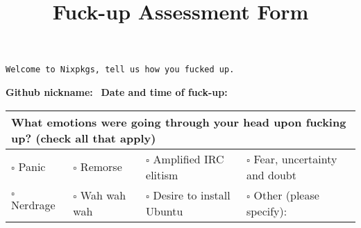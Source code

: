\documentclass{article}
\title{\hspace{-0.39\columnwidth}Fuck-up Assessment Form}
\author{}
\date{\vspace{-3.5em}}
\begin{document}
\maketitle

\begin{center}
\texttt{Welcome to Nixpkgs, tell us how you fucked up.}
\end{center}

\vspace{1em}
\textbf{Github nickname:} \dotfill
\ \textbf{Date and time of fuck-up:} \dotfill
\vspace{0.5em}

\def\arraystretch{1.5}  %
\begin{tabularx}{\textwidth}{|lllX|}
\hline
\multicolumn{4}{|l|}{\textbf{What emotions were going through your head upon fucking up?} (check all that apply)} \\ \hline
\(\square\) Panic &
\(\square\) Remorse &
\(\square\) Amplified IRC elitism &
\(\square\) Fear, uncertainty and doubt \\

\(\square\) Nerdrage &
\(\square\) Wah wah wah &
\(\square\) Desire to install Ubuntu &
\(\square\) Other (please specify): \dotfill \\ \hline
\end{tabularx}

\vspace{0.5em}

\newlength{\listenedwidth}
\newlength{\didntlistenwidth}
\settowidth{\listenedwidth}{I listened to}
\settowidth{\didntlistenwidth}{I didn't listen to}
\end{document}
